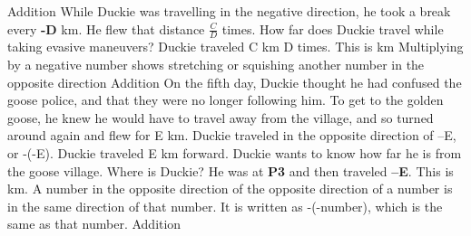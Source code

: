 \documentclass[a4paper,11pt ]{book}
\begin{document}
{Addition}
{While Duckie was travelling in the negative direction, he took a break every \textbf{-D} km. He flew that distance $\frac{C}{D}$ times. How far does Duckie travel while taking evasive maneuvers?}
{Duckie traveled C km D times. This is  km}
{Multiplying by a negative number shows stretching or squishing another number in the opposite direction}
{Addition}
{On the fifth day, Duckie thought he had confused the goose police, and that they were no longer following him. To get to the golden goose, he knew he would have to travel away from the village, and so turned around again and flew for E km. Duckie traveled in the opposite direction of –E, or -(-E). Duckie traveled E km forward. Duckie wants to know how far he is from the goose village. Where is Duckie?}
{He was at \textbf{P3} and then traveled \textbf{--E}. This is  km.}
{A number in the opposite direction of the opposite direction of a number is in the same direction of that number. It is written as -(-number), which is the same as  that number.}
{Addition}
\end{document}
